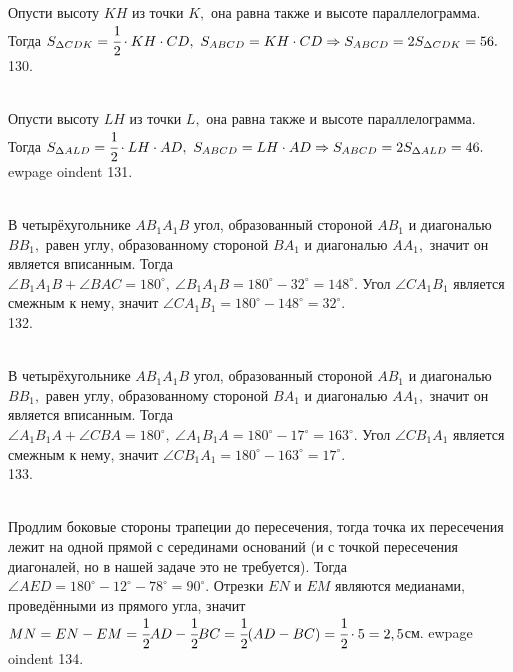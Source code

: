 Опусти высоту $KH$ из точки $K,$ она равна также и высоте параллелограмма. Тогда $S_{\Delta CDK}=\cfrac{1}{2}\cdot KH\cdot CD,\ S_{ABCD}=KH\cdot CD\Rightarrow
S_{ABCD}=2S_{\Delta CDK}=56.$\\
130. \begin{figure}[ht!]
\end{figure}\\
Опусти высоту $LH$ из точки $L,$ она равна также и высоте параллелограмма. Тогда $S_{\Delta ALD}=\cfrac{1}{2}\cdot LH\cdot AD,\ S_{ABCD}=LH\cdot AD\Rightarrow
S_{ABCD}=2S_{\Delta ALD}=46.$
ewpage
oindent
131. \begin{figure}[ht!]
\end{figure}\\
В четырёхугольнике $AB_1A_1B$ угол, образованный стороной $AB_1$ и диагональю $BB_1,$ равен углу, образованному стороной $BA_1$ и диагональю $AA_1,$ значит он является вписанным. Тогда $\angle B_1A_1B+\angle BAC=180^\circ,\ \angle B_1A_1B=180^\circ-32^\circ=148^\circ.$ Угол $\angle CA_1B_1$ является смежным к нему, значит $\angle CA_1B_1=180^\circ-148^\circ=32^\circ.$\\
132. \begin{figure}[ht!]
\end{figure}\\
В четырёхугольнике $AB_1A_1B$ угол, образованный стороной $AB_1$ и диагональю $BB_1,$ равен углу, образованному стороной $BA_1$ и диагональю $AA_1,$ значит он является вписанным. Тогда $\angle A_1B_1A+\angle CBA=180^\circ,\ \angle A_1B_1A=180^\circ-17^\circ=163^\circ.$ Угол $\angle CB_1A_1$ является смежным к нему, значит $\angle CB_1A_1=180^\circ-163^\circ=17^\circ.$\\
133. \begin{figure}[ht!]
\end{figure}\\
Продлим боковые стороны трапеции до пересечения, тогда точка их пересечения лежит на одной прямой с серединами оснований (и с точкой пересечения диагоналей, но в нашей задаче это не требуется). Тогда $\angle AED=180^\circ-12^\circ-78^\circ=90^\circ.$ Отрезки $EN$ и $EM$ являются медианами, проведёнными из прямого угла, значит $MN=EN-EM=\cfrac{1}{2}AD-\cfrac{1}{2}BC=\cfrac{1}{2}(AD-BC)=\cfrac{1}{2}\cdot5=2,5$см.
ewpage
oindent
134. \begin{figure}[ht!]
\end{figure}\\
